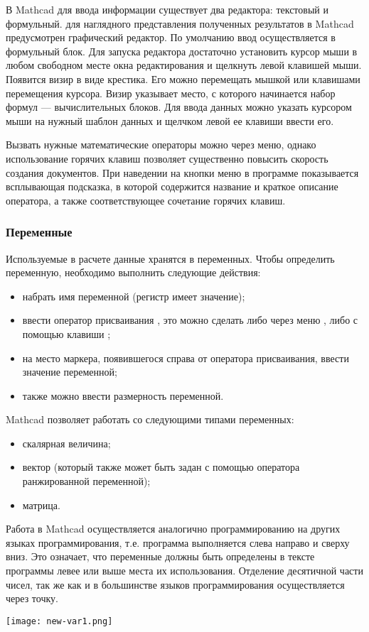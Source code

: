 В Mathcad для ввода информации существует два редактора: текстовый и формульный. для наглядного представления полученных результатов в Mathcad предусмотрен графический редактор. По умолчанию ввод осуществляется в формульный блок. Для запуска редактора достаточно установить курсор мыши в любом свободном месте окна редактирования и щелкнуть левой клавишей мыши. Появится визир в виде крестика. Его можно перемещать мышкой или клавишами перемещения курсора. Визир указывает место, с которого начинается набор формул --- вычислительных блоков. Для ввода данных можно указать курсором мыши на нужный шаблон данных и щелчком левой ее клавиши ввести его.

Вызвать нужные математические операторы можно через меню, однако использование горячих клавиш позволяет существенно повысить скорость создания документов. При наведении на кнопки меню в программе показывается всплывающая подсказка, в которой содержится название и краткое описание оператора, а также соответствующее сочетание горячих клавиш.

\subsubsection*{Переменные}
Используемые в расчете данные хранятся в переменных. Чтобы определить переменную, необходимо выполнить следующие действия:
\begin{itemize}
	\item набрать имя переменной (регистр имеет значение);
	\item ввести оператор присваивания \mc{:=}, это можно сделать либо через меню ,  либо с помощью клавиши \keys{:};
	\item на место маркера, появившегося справа от оператора присваивания, ввести значение переменной;
	\item также можно ввести размерность переменной.
\end{itemize}
Mathcad позволяет работать со следующими типами переменных:
\begin{itemize}
\item скалярная величина;
\item вектор (который также может быть задан с помощью оператора ранжированной переменной);
\item матрица.
\end{itemize}

Работа в Mathcad осуществляется аналогично программированию на других языках программирования, т.е. программа выполняется слева направо и сверху вниз. Это означает, что переменные должны быть определены в тексте программы левее или выше места их использования. Отделение десятичной части чисел, так же как и в большинстве языков программирования осуществляется через точку.
\begin{center}
	\texttt{[image: new-var1.png]}
\end{center}

